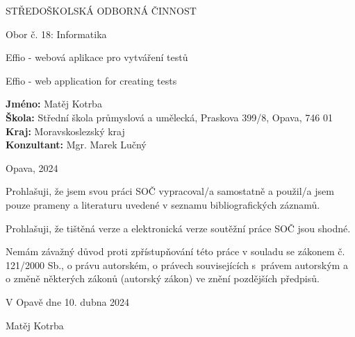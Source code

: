 \documentclass[12pt, a4paper,
openright
]{report}
\newcommand\city{Opava} %
\newcommand\district{Moravskoslezský kraj} %
\newcommand\specialization{Obor č. 18: Informatika} %
\newcommand\school{ Střední škola průmyslová a umělecká, Praskova 399/8, Opava, 746 01} %
\newcommand\consultant{Mgr. Marek Lučný} %
\newcommand\authorName{Matěj Kotrba}  %
\newcommand\publicationYear{2024} %
\newcommand\mainTitle{Effio - webová aplikace pro vytváření testů} %
\begin{document}
{\bfseries %
    \begin{center}
        \LARGE{STŘEDOŠKOLSKÁ ODBORNÁ ČINNOST}

        \vspace{14pt}
        {\large %
            \specialization %
        } %

        \vspace{0.3 \textheight}

        \LARGE{ %
        \mainTitle
        }

        \LARGE{ %
        Effio - web application for creating tests
        }%

        \vspace{0.24\textheight}
    \end{center}  
}%
{\Large %
    \noindent\textbf{Jméno:} \authorName\\
    \textbf{Škola:} \school\\
    \textbf{Kraj:} \district\\
    \textbf{Konzultant:} \consultant\\
} %

\noindent \city, \publicationYear

\cleardoublepage


\noindent Prohlašuji, že jsem svou práci SOČ vypracoval/a samostatně a použil/a jsem pouze prameny a literaturu uvedené v seznamu bibliografických záznamů.

\noindent Prohlašuji, že tištěná verze a elektronická verze soutěžní práce SOČ jsou shodné. 

\noindent Nemám závažný důvod proti zpřístupňování této práce v souladu se zákonem č. 121/2000 Sb., o právu autorském, o právech souvisejících s~právem autorským a o změně některých zákonů (autorský zákon) ve znění pozdějších předpisů. 

\vspace{24 pt}

\noindent V Opavě dne 10. dubna 2024 \dotfill{} 

\hspace{8cm} \authorName

\cleardoublepage

\end{document}
